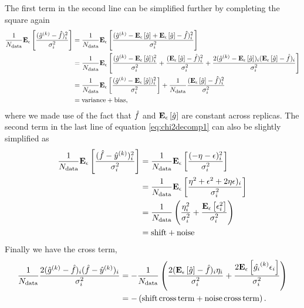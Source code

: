 The first term in the second line can be simplified further by completing the
square again
\begin{equation}
    \begin{split}
        \frac{1}{N_{\rm data}}\mathbf{E}_{\epsilon}\left[ \frac{(\hat{g}^{(k)} - \hat{f})^2_i}{\sigma^{2}_i} \right] &=
        \frac{1}{N_{\rm data}}\mathbf{E}_{\epsilon}\left[ \frac{(\hat{g}^{(k)} - \mathbf{E}_{\epsilon}\left[ \hat{g} \right] + \mathbf{E}_{\epsilon}\left[ \hat{g} \right] - \hat{f})^2_i}{\sigma^{2}_i} \right] \\
        &= \frac{1}{N_{\rm data}}\mathbf{E}_{\epsilon}\left[ \frac{(\hat{g}^{(k)} - \mathbf{E}_{\epsilon}\left[ \hat{g} \right])_i^2}{\sigma^{2}_i} +
        \frac{(\mathbf{E}_{\epsilon}\left[ \hat{g} \right] - \hat{f})^2_i}{\sigma^{2}_i} +
        \frac{2(\hat{g}^{(k)} - \mathbf{E}_{\epsilon}\left[ \hat{g} \right])_i(\mathbf{E}_{\epsilon}\left[ \hat{g} \right] - \hat{f})_i}{\sigma^{2}_i} \right] \\
        &= \frac{1}{N_{\rm data}}\mathbf{E}_{\epsilon}\left[ \frac{(\hat{g}^{(k)} - \mathbf{E}_{\epsilon}\left[ \hat{g} \right])_i^2}{\sigma^{2}_i} \right] +
        \frac{1}{N_{\rm data}}\frac{(\mathbf{E}_{\epsilon}\left[ \hat{g} \right] - \hat{f})^2_i}{\sigma^{2}_i} \\
        &= {\rm variance} + {\rm bias},
    \end{split}
\end{equation}
where we made use of the fact that $\hat{f}$ and $\mathbf{E}_{\epsilon}\left[ \hat{g} \right]$
are constant across replicas. The second term in the last line of equation
\eqref{eq:chi2decomp1} can also be slightly simplified as
\begin{equation}
    \begin{split}
        \frac{1}{N_{\rm data}}\mathbf{E}_{\epsilon}\left[ \frac{(\hat{f} - \hat{y}^{(k)})_i^2}{\sigma^{2}_i} \right] &=
        \frac{1}{N_{\rm data}}\mathbf{E}_{\epsilon}\left[ \frac{(-\eta - \epsilon)_i^2}{\sigma^{2}_i} \right] \\
        &= \frac{1}{N_{\rm data}}\mathbf{E}_{\epsilon}\left[ \frac{\eta^2 + \epsilon^2 + 2\eta\epsilon)_i}{\sigma^{2}_i} \right] \\
        &= \frac{1}{N_{\rm data}} \left(\frac{\eta_i^2}{\sigma^{2}_i} + \frac{\mathbf{E}_{\epsilon}\left[ \epsilon_i^2 \right]}{\sigma^{2}_i} \right) \\
        &= {\rm shift} + {\rm noise}
    \end{split}
\end{equation}
Finally we have the cross term,
\begin{equation}
    \begin{split}
        \frac{1}{N_{\rm data}}\frac{2(\hat{g}^{(k)} - \hat{f})_i(\hat{f} - \hat{y}^{(k)})_i}{\sigma^{2}_i} &=
             - \frac{1}{N_{\rm data}} \left( \frac{2(\mathbf{E}_{\epsilon}\left[ \hat{g} \right] - \hat{f})_i\eta_i}{\sigma^{2}_i} +
             \frac{2\mathbf{E}_{\epsilon}\left[ \hat{g_i}^{(k)} \epsilon_i \right]}{\sigma^{2}_i} \right) \\
         &= - \left( {\rm shift \, cross \, term} + {\rm noise \, cross \, term} \right).
    \end{split}
\end{equation}
